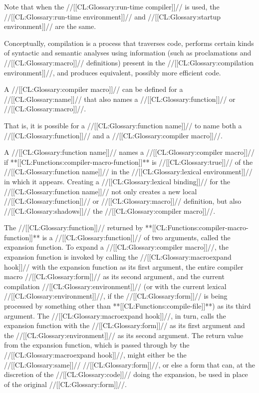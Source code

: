 Note that when the //[[CL:Glossary:run-time compiler]]// is used,
the //[[CL:Glossary:run-time environment]]// 
and //[[CL:Glossary:startup environment]]// 
are the same.

\endsubSection%
 
 
Conceptually, compilation is a process that traverses code, performs
certain kinds of syntactic and semantic analyses using information
(such as proclamations and //[[CL:Glossary:macro]]// definitions) present in the
//[[CL:Glossary:compilation environment]]//, and produces equivalent, possibly
more efficient code.



A //[[CL:Glossary:compiler macro]]// can be defined for a //[[CL:Glossary:name]]//
that also names a //[[CL:Glossary:function]]// or //[[CL:Glossary:macro]]//.



That is, it is possible for a
//[[CL:Glossary:function name]]// to name both a //[[CL:Glossary:function]]// and a //[[CL:Glossary:compiler macro]]//.

A //[[CL:Glossary:function name]]// names a //[[CL:Glossary:compiler macro]]// if **[[CL:Functions:compiler-macro-function]]**
is //[[CL:Glossary:true]]// of the //[[CL:Glossary:function name]]// in the //[[CL:Glossary:lexical environment]]// in which
it appears.  Creating a //[[CL:Glossary:lexical binding]]// for the //[[CL:Glossary:function name]]//
not only creates a new local //[[CL:Glossary:function]]// or
//[[CL:Glossary:macro]]// definition, but also //[[CL:Glossary:shadows]]// the //[[CL:Glossary:compiler macro]]//.

The //[[CL:Glossary:function]]// returned by **[[CL:Functions:compiler-macro-function]]**
is a //[[CL:Glossary:function]]// of two arguments, called the
expansion function.  To expand a //[[CL:Glossary:compiler macro]]//,
the expansion function is invoked by calling the //[[CL:Glossary:macroexpand hook]]// with
      the expansion function as its first argument,
      the entire compiler macro //[[CL:Glossary:form]]// as its second argument,
  and the current compilation //[[CL:Glossary:environment]]// 
       (or with the current lexical //[[CL:Glossary:environment]]//,
 	 if the //[[CL:Glossary:form]]// is being processed by something
	 other than **[[CL:Functions:compile-file]]**) 
       as its third argument.
The //[[CL:Glossary:macroexpand hook]]//, in turn, calls the expansion function with the
//[[CL:Glossary:form]]// as its first argument and the //[[CL:Glossary:environment]]// as its second argument.
The return value from the expansion function, which is passed through
by the //[[CL:Glossary:macroexpand hook]]//, might either be the //[[CL:Glossary:same]]// //[[CL:Glossary:form]]//, 
or else a form that can, at the discretion of the //[[CL:Glossary:code]]// doing the expansion, 
be used in place of the original //[[CL:Glossary:form]]//.

